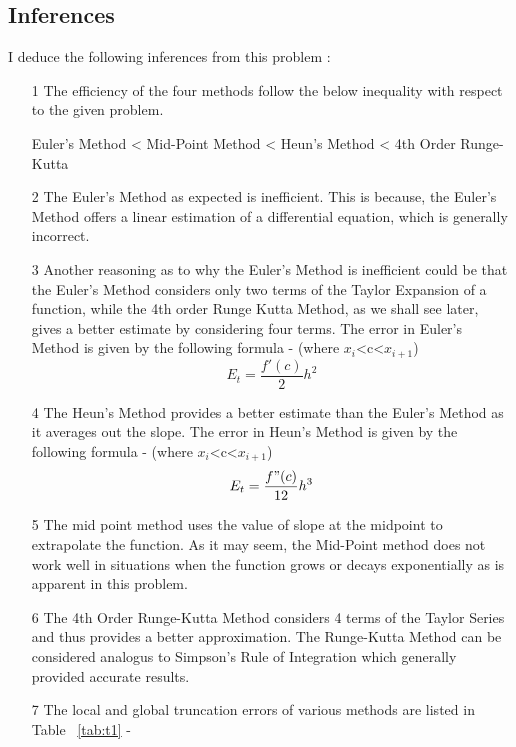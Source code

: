\documentclass[titlepage, 11pt]{article}
\begin{document}

\subsection{Inferences}
I deduce the following inferences from this problem :
\begin{itemize}
    \item [1] The efficiency of the four methods follow the below inequality with respect to the given problem.
    \begin{center}
        
        Euler's Method < Mid-Point Method < Heun's Method < 4th Order Runge-Kutta
    \end{center}
    \item [2] The Euler's Method as expected is inefficient. This is because, the Euler's Method offers a linear estimation of a differential equation, which is generally incorrect.
    \item [3] Another reasoning as to why the Euler's Method is inefficient could be that the Euler's Method considers only two terms of the Taylor Expansion of a function, while the 4th order Runge Kutta Method, as we shall see later, gives a better estimate by considering four terms. The error in Euler's Method is given by the following formula - (where $x_i$<c<$x_{i+1}$) 
    \begin{equation}
        E_t = \frac{f'(c)}{2}h^2
    \end{equation}
    \item [4] The Heun's Method provides a better estimate than the Euler's Method as it averages out the slope. The error in Heun's Method is given by the following formula - (where $x_i$<c<$x_{i+1}$)
    \begin{equation}
        E_t = \frac{f"(c)}{12}h^3
    \end{equation}
    \item [5] The mid point method uses the value of slope at the midpoint to extrapolate the function. As it may seem, the Mid-Point method does not work well in situations when the function grows or decays exponentially as is apparent in this problem.
    \item [6] The 4th Order Runge-Kutta Method considers 4 terms of the Taylor Series and thus provides a better approximation. The Runge-Kutta Method can be considered analogus to Simpson's Rule of Integration which generally provided accurate results.
    \item [7] The local and global truncation errors of various methods are listed in  Table ~\ref{tab:t1} - 

\end{itemize}
\end{document}
